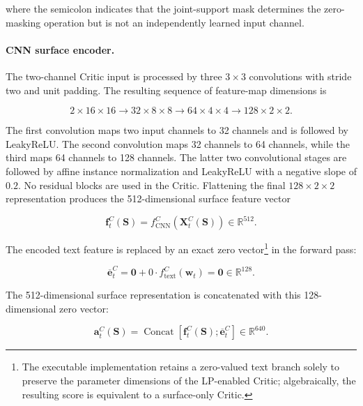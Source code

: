 where the semicolon indicates that the joint-support mask determines the
zero-masking operation but is not an independently learned input channel.


\paragraph*{CNN surface encoder.}
The two-channel Critic input is processed by three $3\times3$ convolutions
with stride two and unit padding. The resulting sequence of feature-map
dimensions is

\begin{equation}\label{eq:ch3:critic_cnn_dimensions}
2\times16\times16
\longrightarrow
32\times8\times8
\longrightarrow
64\times4\times4
\longrightarrow
128\times2\times2.
\end{equation}

The first convolution maps two input channels to 32 channels and is followed
by LeakyReLU. The second convolution maps 32 channels to 64 channels, while
the third maps 64 channels to 128 channels. The latter two convolutional
stages are followed by affine instance normalization and LeakyReLU with a
negative slope of $0.2$. No residual blocks are used in the Critic. Flattening
the final $128\times2\times2$ representation produces the 512-dimensional
surface feature vector

\begin{equation}\label{eq:ch3:critic_surface_features}
\mathbf{f}^{C}_t(\mathbf{S})
=
f^{C}_{\mathrm{CNN}}
\left(
\mathbf{X}^{C}_t(\mathbf{S})
\right)
\in
\mathbb{R}^{512}.
\end{equation}


The encoded text feature is replaced by an exact zero vector\footnote{The executable implementation retains a zero-valued text branch solely to
preserve the parameter dimensions of the LP-enabled Critic; algebraically,
the resulting score is equivalent to a surface-only Critic.} in the forward pass:

\begin{equation}\label{eq:ch3:nolp_zero_text}
\overline{\mathbf{e}}^{C}_t
=
\mathbf{0}
+
0\cdot
f^{C}_{\mathrm{text}}
\left(
\mathbf{w}_t
\right)
=
\mathbf{0}
\in
\mathbb{R}^{128}.
\end{equation}

The 512-dimensional surface representation is concatenated with this
128-dimensional zero vector:

\begin{equation}\label{eq:ch3:critic_feature_concatenation}
\mathbf{a}^{C}_t(\mathbf{S})
=
\operatorname{Concat}
\left[
\mathbf{f}^{C}_t(\mathbf{S});
\overline{\mathbf{e}}^{C}_t
\right]
\in
\mathbb{R}^{640}.
\end{equation}

